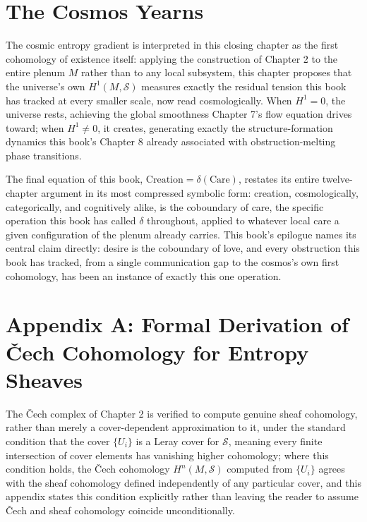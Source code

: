 \chapter{The Cosmos Yearns}

The cosmic entropy gradient is interpreted in this closing chapter as the first cohomology of existence itself: applying the construction of Chapter 2 to the entire plenum $M$ rather than to any local subsystem, this chapter proposes that the universe's own $H^1(M, \mathcal{S})$ measures exactly the residual tension this book has tracked at every smaller scale, now read cosmologically. When $H^1 = 0$, the universe rests, achieving the global smoothness Chapter 7's flow equation drives toward; when $H^1 \neq 0$, it creates, generating exactly the structure-formation dynamics this book's Chapter 8 already associated with obstruction-melting phase transitions.

The final equation of this book, $\text{Creation} = \delta(\text{Care})$, restates its entire twelve-chapter argument in its most compressed symbolic form: creation, cosmologically, categorically, and cognitively alike, is the coboundary of care, the specific operation this book has called $\delta$ throughout, applied to whatever local care a given configuration of the plenum already carries. This book's epilogue names its central claim directly: desire is the coboundary of love, and every obstruction this book has tracked, from a single communication gap to the cosmos's own first cohomology, has been an instance of exactly this one operation.

\chapter*{Appendix A: Formal Derivation of Čech Cohomology for Entropy Sheaves}

The Čech complex of Chapter 2 is verified to compute genuine sheaf cohomology, rather than merely a cover-dependent approximation to it, under the standard condition that the cover $\{U_i\}$ is a Leray cover for $\mathcal{S}$, meaning every finite intersection of cover elements has vanishing higher cohomology; where this condition holds, the Čech cohomology $H^n(M,\mathcal{S})$ computed from $\{U_i\}$ agrees with the sheaf cohomology defined independently of any particular cover, and this appendix states this condition explicitly rather than leaving the reader to assume Čech and sheaf cohomology coincide unconditionally.

